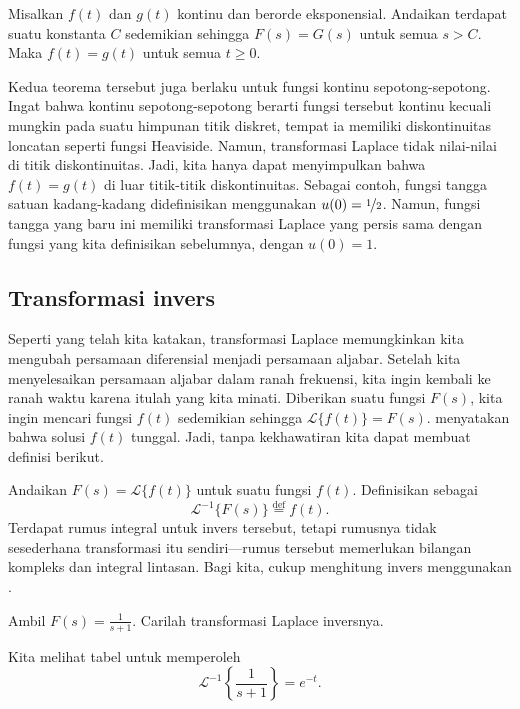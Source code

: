 \begin{theorem}[Ketunggalan] \label{lt:uniqthm}
Misalkan $f(t)$ dan $g(t)$ kontinu dan berorde eksponensial.
Andaikan terdapat suatu konstanta $C$
sedemikian sehingga $F(s) = G(s)$ untuk semua $s > C$.
Maka $f(t) = g(t)$ untuk semua $t \geq 0$.
\end{theorem}

Kedua teorema tersebut juga berlaku untuk fungsi kontinu sepotong-sepotong.
Ingat bahwa kontinu sepotong-sepotong berarti fungsi tersebut
kontinu kecuali mungkin pada suatu himpunan titik diskret, tempat ia memiliki
diskontinuitas loncatan seperti fungsi Heaviside.  Namun, transformasi Laplace tidak
 nilai-nilai di titik diskontinuitas.  Jadi, kita hanya dapat menyimpulkan bahwa
$f(t) = g(t)$ di luar titik-titik diskontinuitas.  Sebagai contoh, fungsi tangga
satuan kadang-kadang didefinisikan menggunakan $u(0) = \nicefrac{1}{2}$.  Namun, fungsi
tangga yang baru ini memiliki transformasi Laplace yang persis sama
dengan fungsi yang kita definisikan sebelumnya, dengan $u(0) = 1$.

\subsection{Transformasi invers}

Seperti yang telah kita katakan, transformasi Laplace memungkinkan kita mengubah persamaan
diferensial menjadi persamaan aljabar.  Setelah kita menyelesaikan
persamaan aljabar dalam ranah frekuensi, kita ingin kembali ke
ranah waktu karena itulah yang kita minati.
Diberikan suatu fungsi
$F(s)$, kita ingin mencari fungsi
$f(t)$ sedemikian sehingga $\mathcal{L} \bigl\{ f(t) \bigr\} = F(s)$.
 menyatakan bahwa solusi $f(t)$ tunggal.
Jadi, tanpa kekhawatiran kita dapat membuat definisi berikut.

Andaikan $F(s) = \mathcal{L} \bigl\{ f(t) \bigr\}$ untuk suatu fungsi $f(t)$.
Definisikan
\emph{} sebagai
\begin{equation*}
{\mathcal{L}}^{-1} \bigl\{ F(s) \bigr\} \overset{\text{def}}{=} f(t) .
\end{equation*}
Terdapat rumus integral untuk invers tersebut, tetapi rumusnya tidak sesederhana
transformasi itu sendiri---rumus tersebut memerlukan bilangan kompleks dan integral lintasan.
Bagi kita, cukup
menghitung invers
menggunakan .

\begin{example}
Ambil
$F(s) = \frac{1}{s+1}$.  Carilah transformasi Laplace inversnya.

Kita melihat tabel untuk memperoleh
\begin{equation*}
{\mathcal{L}}^{-1} \left\{ \frac{1}{s+1} \right\} = 
e^{-t} .
\end{equation*}
\end{example}

